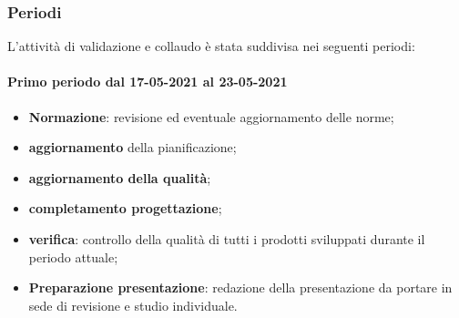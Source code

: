 \subsubsection{Periodi}
L'attività di validazione e collaudo è stata suddivisa nei seguenti periodi:
\paragraph{Primo periodo dal 17-05-2021 al 23-05-2021}
\begin{itemize}
	\item \textbf{Normazione}: revisione ed eventuale aggiornamento delle norme;
	\item \textbf{aggiornamento} della pianificazione;
	\item \textbf{aggiornamento della qualità};
	\item \textbf{completamento progettazione};
	\item \textbf{verifica}: controllo della qualità di tutti i prodotti sviluppati durante il periodo attuale;
	\item \textbf{Preparazione presentazione}: redazione della presentazione da portare in sede di revisione e
	studio individuale.
\end{itemize}